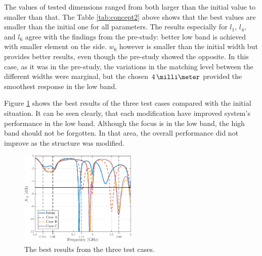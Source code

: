 The values of tested dimensions ranged from both larger than the initial value to smaller than that. The Table \ref{tab:concept2} above shows that the best values are smaller than the initial one for all parameters. The results especially for $l_1$, $l_4$, and $l_6$ agree with the findings from the pre-study: better low band is achieved with smaller element on the side. $w_6$ however is smaller than the initial width but provides better results, even though the pre-study showed the opposite. In this case, as it was in the pre-study, the variations in the matching level between the different widths were marginal, but the chosen $4\,\milli\meter$ provided the smoothest response in the low band.

Figure \ref{fig:concept2} shows the best results of the three test cases compared with the initial situation. It can be seen clearly, that each modification have improved system's performance in the low band. Although the focus is in the low band, the high band should not be forgotten. In that area, the overall performance did not improve as the structure was modified. 
\begin{figure}[H]
    \centering
    \includegraphics[width=0.5\textwidth]{img/concept2.eps}
    \caption{The best results from the three test cases.}
    \label{fig:concept2}
\end{figure}

